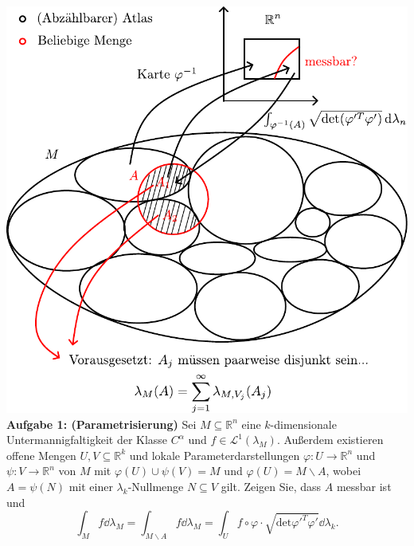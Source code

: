 \documentclass[12pt]{revtex4-2}
\theoremstyle{definition}
\theoremstyle{definition}
\newcommand{\R}{\mathbb{R}}
\begin{document}
	\includegraphics[width=\textwidth]{manifolds.pdf}
	\textbf{Aufgabe 1: (Parametrisierung)} Sei $M\subseteq \R^n$ eine $k$-dimensionale Untermannigfaltigkeit der Klasse $C^\alpha$ und $f\in \mathcal{L}^1(\lambda_M)$. Außerdem existieren offene Mengen $U,V\subseteq \R^k$ und lokale Parameterdarstellungen $\varphi:U\to \R^n$ und $\psi:V\to\R^n$ von $M$ mit $\varphi(U)\cup \psi(V)=M$ und $\varphi(U)=M\backslash A$, wobei $A=\psi(N)$ mit einer $\lambda_k$-Nullmenge $N\subseteq V$ gilt. Zeigen Sie, dass $A$ messbar ist und
          \[
		\int_M f\dd{\lambda_M}=\int_{M\backslash A} f\dd{\lambda_M}=\int_U f\circ \varphi \cdot \sqrt{\text{det}\varphi'^T\varphi'} \dd{\lambda_k}
	.\] 
\end{document}
